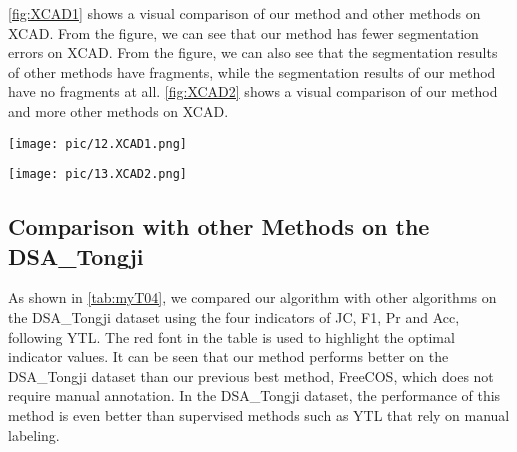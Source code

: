 \cref{fig:XCAD1} shows a visual comparison of our method and other methods on XCAD. From the figure, we can see that our method has fewer segmentation errors on XCAD. From the figure, we can also see that the segmentation results of other methods have fragments, while the segmentation results of our method have no fragments at all. 
\cref{fig:XCAD2} shows a visual comparison of our method and more other methods on XCAD.

\begin{figure*}[htbp]
    \centering
    \texttt{[image: pic/12.XCAD1.png]}
    \caption{Visual analysis on XCAD}
    \label{fig:XCAD1}
\end{figure*}

\begin{figure*}[htbp]
    \centering
    \texttt{[image: pic/13.XCAD2.png]}
    \caption{Visual comparison with more methods on XCAD}
    \label{fig:XCAD2}
\end{figure*}

\subsection{Comparison with other Methods on the DSA\_Tongji}

As shown in \cref{tab:myT04}, we compared our algorithm with other algorithms on the DSA\_Tongji dataset using the four indicators of JC, F1, Pr and Acc, following YTL\cite{YTL}. 
The red font in the table is used to highlight the optimal indicator values. 
It can be seen that our method performs better on the DSA\_Tongji dataset than our previous best method, FreeCOS, which does not require manual annotation. 
In the DSA\_Tongji dataset, the performance of this method is even better than supervised methods such as YTL that rely on manual labeling.

